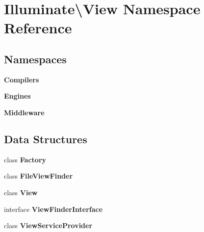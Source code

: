 \section{Illuminate\textbackslash{}View Namespace Reference}
\label{namespace_illuminate_1_1_view}
\subsection*{Namespaces}
\begin{DoxyCompactItemize}
\item 
 {\bf Compilers}
\item 
 {\bf Engines}
\item 
 {\bf Middleware}
\end{DoxyCompactItemize}
\subsection*{Data Structures}
\begin{DoxyCompactItemize}
\item 
class {\bf Factory}
\item 
class {\bf File\+View\+Finder}
\item 
class {\bf View}
\item 
interface {\bf View\+Finder\+Interface}
\item 
class {\bf View\+Service\+Provider}
\end{DoxyCompactItemize}
